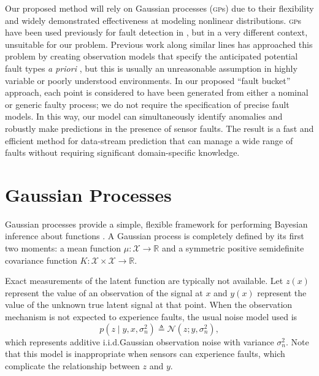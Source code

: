 \documentclass{article}
\newcommand{\R}{\ensuremath{\mathbb{R}}}
\newcommand{\deq}{\ensuremath{\triangleq}}
\newcommand{\given}{\ensuremath{\mid}}
\newcommand{\cm}[1]{\ensuremath{\mathcal{#1}}}
\newcommand{\acro}[1]{\textsc{#1}}
\begin{document}
Our proposed method will rely on Gaussian processes (\acro{gp}s) due
to their flexibility and widely demonstrated effectiveness at modeling
nonlinear distributions. \acro{gp}s have been used previously for
fault detection in \citep{Eciolaza2001}, but in a very different
context, unsuitable for our problem. Previous work along similar lines
has approached this problem by creating observation models that
specify
the anticipated potential fault types \textit{a priori}
\citep{garnettosborne}, but this is usually an unreasonable assumption
in highly variable or poorly understood environments. 
In our proposed  ``fault bucket'' approach, each point is considered
to have been generated from either a nominal or generic faulty process; we do not require the specification of precise fault models. In
this way, our model can simultaneously identify anomalies and robustly
make predictions in the presence of sensor faults. 
The result is a fast and efficient method for data-stream prediction
that can manage a
wide range of faults without requiring significant
domain-specific knowledge.\section{Gaussian Processes}

Gaussian processes provide a simple, flexible framework for performing
Bayesian inference about functions \citep{gpml}.  A Gaussian process
is completely defined by its first two moments: a mean function
$\mu\colon \cm{X} \to \R$ and a symmetric positive semidefinite
covariance function $K\colon \cm{X} \times \cm{X} \to \R$.

Exact measurements of the latent function are typically not available.
Let $z(x)$ represent the value of an observation of the signal at $x$
and $y(x)$ represent the value of the unknown true latent signal at
that point.  When the observation mechanism is not expected to
experience faults, the usual noise model used is
\begin{equation}\label{iidnoise}
 p(z \given y, x, \sigma_n^2)
 \deq
 \cm{N}(z; y, \sigma_n^2),
\end{equation}
which represents additive i.i.d.\space Gaussian observation noise with
variance $\sigma_n^2$. Note that this model is inappropriate when
sensors can experience faults, which complicate the relationship
between $z$ and $y$.
\end{document}
